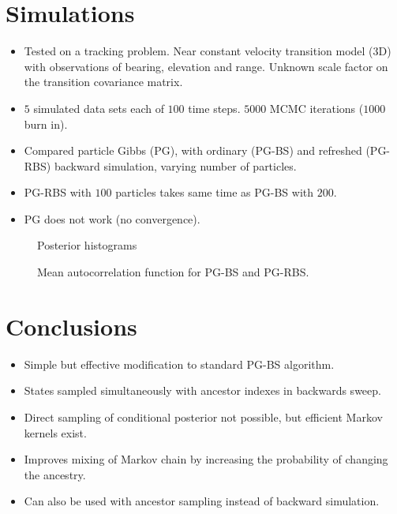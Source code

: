 \documentclass[landscape,a0,plainboxedsections]{sciposter}
\newcommand{\ti}{t}
\newcommand{\pw}[1]{w_{#1}}
\newcommand{\ppw}[1]{v_{#1}}
\newcommand{\pss}[1]{^{(#1)}}
\begin{document}
\begin{multicols}{4}
\section{Simulations}
\begin{itemize}
 \item Tested on a tracking problem. Near constant velocity transition model (3D) with observations of bearing, elevation and range. Unknown scale factor on the transition covariance matrix.
 \item $5$ simulated data sets each of $100$ time steps. $5000$ MCMC iterations ($1000$ burn in).
 \item Compared particle Gibbs (PG), with ordinary (PG-BS) and refreshed (PG-RBS) backward simulation, varying number of particles.
 \item PG-RBS with $100$ particles takes same time as PG-BS with $200$.
 \item PG does not work (no convergence).
\end{itemize}

\begin{figure}
\centering
\subfigure[{\small PG-BS ($N=100$)}]{  }
\subfigure[{\small PG-BS ($N=200$)}]{  }
\subfigure[{\small PG-RBS ($N=100$)}]{  }
\caption{Posterior histograms}
\label{fig:sample_hist}
\end{figure}
%
\begin{figure}
\centering

\caption{Mean autocorrelation function for PG-BS and PG-RBS.}
\label{fig:acf}
\end{figure}
\vspace{-2cm}
%
%
%
\section{Conclusions}
\begin{itemize}
 \item Simple but effective modification to standard PG-BS algorithm.
 \item States sampled simultaneously with ancestor indexes in backwards sweep.
 \item Direct sampling of conditional posterior not possible, but efficient Markov kernels exist.
 \item Improves mixing of Markov chain by increasing the probability of changing the ancestry.
 \item Can also be used with ancestor sampling \cite{Lindsten2014} instead of backward simulation.
\end{itemize}




{ \small


% 
}
\vfill

\end{multicols}
\end{document}
